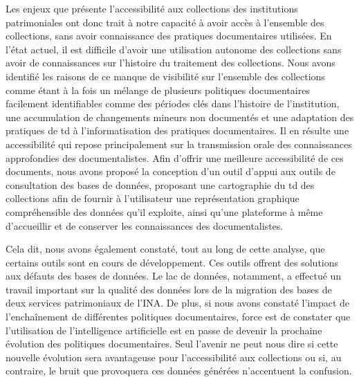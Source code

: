 Les enjeux que présente l'accessibilité aux collections des institutions patrimoniales ont donc trait à notre capacité à avoir accès à l'ensemble des collections, sans avoir connaissance des pratiques documentaires utilisées. En l'état actuel, il est difficile d'avoir une utilisation autonome des collections sans avoir de connaissances sur l'histoire du traitement des collections. Nous avons identifié les raisons de ce manque de visibilité sur l'ensemble des collections comme étant à la fois un mélange de plusieurs politiques documentaires facilement identifiables comme des périodes clés dans l'histoire de l'institution, une accumulation de changements mineurs non documentés et une adaptation des pratiques de \gls{td} à l'informatisation des pratiques documentaires. Il en résulte une accessibilité qui repose principalement sur la transmission orale des connaissances approfondies des documentalistes. Afin d'offrir une meilleure accessibilité de ces documents, nous avons proposé la conception d'un outil d'appui aux outils de consultation des bases de données, proposant une cartographie du \gls{td} des collections afin de fournir à l'utilisateur une représentation graphique compréhensible des données qu'il exploite, ainsi qu'une plateforme à même d'accueillir et de conserver les connaissances des documentalistes.

Cela dit, nous avons également constaté, tout au long de cette analyse, que certains outils sont en cours de développement. Ces outils offrent des solutions aux défauts des bases de données. Le lac de données, notamment, a effectué un travail important sur la qualité des données lors de la migration des bases de deux services patrimoniaux de l'INA. De plus, si nous avons constaté l'impact de l'enchaînement de différentes politiques documentaires, force est de constater que l'utilisation de l'intelligence artificielle est en passe de devenir la prochaine évolution des politiques documentaires. Seul l'avenir ne peut nous dire si cette nouvelle évolution sera avantageuse pour l'accessibilité aux collections ou si, au contraire, le bruit que provoquera ces données générées n'accentuent la confusion. 